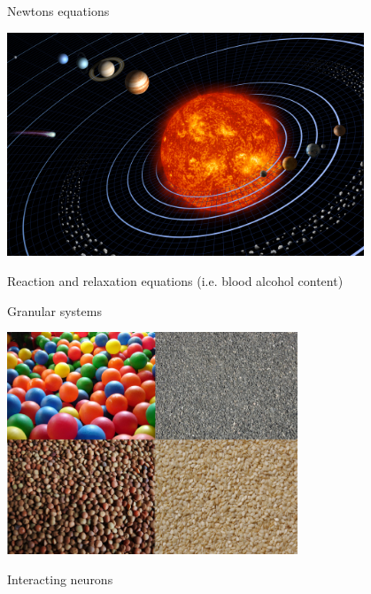 \begin{frame}
 

\vspace{2ex}

\begin{minipage}{0.48\textwidth}
 \begin{center}
  Newtons equations

  \includegraphics[draft=false,width=0.8\textwidth]{solar_system.jpg}
 \end{center}
\end{minipage}
\pause
\begin{minipage}{0.48\textwidth}
 \begin{center}
  Reaction and relaxation equations (i.e. blood alcohol content)
 \end{center}
\end{minipage}
\pause
\vspace{2ex}

\begin{minipage}{0.48\textwidth}
 \begin{center}
  Granular systems

  \includegraphics[draft=false,width=0.65\textwidth]{granular_system.png}
 \end{center}
\end{minipage}
\pause
\begin{minipage}{0.48\textwidth}
 \begin{center}
  Interacting neurons


\end{center}
\end{minipage}
\end{frame}
